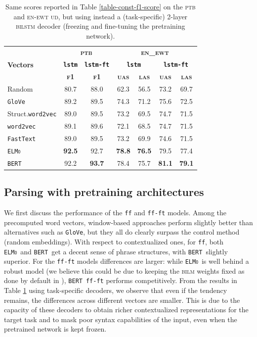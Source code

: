 \documentclass[letterpaper]{article} %
\newcommand{\wordvec}{\texttt{word2vec}}
\newcommand{\fastext}{\texttt{FastText}}
\newcommand{\glove}{\texttt{\textsc{G}lo\textsc{V}e}}
\newcommand{\elmo}{\texttt{\textsc{ELMo}}}
\newcommand{\bert}{\texttt{\textsc{BERT}}}
\begin{document}
\begin{table}[hbtp]
\tabcolsep=0.12cm
\centering
\small{
\begin{tabular}{l|cc|cccc}
\hline
& \multicolumn{2}{c|}{\bf \textsc{ptb}}&\multicolumn{4}{c}{\bf \textsc{en\_ewt}}\\
\bf Vectors & \bf \texttt{lstm} & \bf \texttt{lstm-ft} &\multicolumn{2}{c}{\bf \texttt{lstm}} & \multicolumn{2}{c}{\bf \texttt{lstm-ft}} \\
&\bf \textsc{f1}&\bf \textsc{f1}&\bf \textsc{uas} & \bf \textsc{las} & \bf \textsc{uas} & \bf \textsc{las}  \\
\hline
Random&80.7&88.0&62.3&56.5&73.2&69.7\\
\glove&89.2&89.5&74.3&71.2&75.6&72.5\\
Struct.\wordvec&89.0&89.5&73.2&69.5&74.7&71.5\\
\wordvec&89.1&89.6&72.1&68.5&74.7&71.5\\
\fastext&89.0&89.5&73.2&69.9&74.6&71.5\\
\elmo&\bf 92.5&92.7&\bf 78.8&\bf 76.5&79.5&77.4\\
\bert&92.2&\bf 93.7&78.4&75.7&\bf 81.1&\bf 79.1\\
\hline
\end{tabular}
}
\caption{Same scores reported in Table \ref{table-const-f1-score} on the \textsc{ptb} and \textsc{en-ewt ud}, but using instead a (task-specific) 2-layer \textsc{bilstm} decoder (freezing and fine-tuning the pretraining network).}\label{table-lstm-results}
\end{table}


\subsection{Parsing with pretraining architectures} 

We first discuss the performance of the \texttt{ff} and \texttt{ff-ft} models.
Among the precomputed word vectors, window-based approaches perform slightly better than alternatives such as \glove, but they all do clearly surpass the control method (random embeddings). With respect to contextualized ones, for \texttt{ff}, both \elmo\ and \bert\ get a decent sense of phrase structures, with \bert\ slightly superior.
For the \texttt{ff-ft} models differences are larger: while \elmo\ is well behind a robust model (we believe this could be due to keeping the \textsc{bilm} weights fixed as done by default in \cite{peters2018deep}), \bert\ \texttt{ff-ft} performs competitively. From the results in Table \ref{table-lstm-results} using task-specific decoders, we observe that even if the tendency remains, the differences across different vectors are smaller. This is due to the capacity of these decoders to obtain richer contextualized representations for the target task and to mask poor syntax capabilities of the input, even when the pretrained network is kept frozen.
\end{document}
